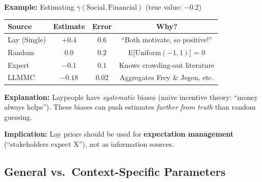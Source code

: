 \begin{tcolorbox}[colback=red!5!white, colframe=red!75!black,
    title=\textbf{Paradox: Random ($C = 0$) Can Beat Lay ($C = 0.05$)}]

\textbf{Example:} Estimating $\gamma(\text{Social}, \text{Financial})$ (true value: $-0.2$)

\begin{center}
\renewcommand{\arraystretch}{1.2}
\begin{tabular}{@{}lccc@{}}
\toprule
\textbf{Source} & \textbf{Estimate} & \textbf{Error} & \textbf{Why?} \\
\midrule
Lay (Single) & $+0.4$ & $0.6$ & ``Both motivate, so positive!'' \\
Random & $0.0$ & $0.2$ & E[Uniform$(-1,1)$] = 0 \\
Expert & $-0.1$ & $0.1$ & Knows crowding-out literature \\
LLMMC & $-0.18$ & $0.02$ & Aggregates Frey \& Jegen, etc. \\
\bottomrule
\end{tabular}
\end{center}

\textbf{Explanation:} Laypeople have \textit{systematic} biases (naive incentive theory: ``money always helps''). These biases can push estimates \textit{further from truth} than random guessing.

\textbf{Implication:} Lay priors should be used for \textbf{expectation management} (``stakeholders expect X''), not as information sources.

\end{tcolorbox}

\subsection{General vs.\ Context-Specific Parameters}
\label{sec:ie-parameter-types}

